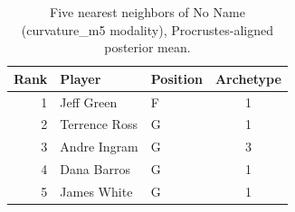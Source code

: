 \begin{table}[htbp]
  \centering\small
  \begin{tabular}{rllc}
    \toprule
    Rank & Player & Position & Archetype \\
    \midrule
    1 & Jeff Green & F & 1 \\
    2 & Terrence Ross & G & 1 \\
    3 & Andre Ingram & G & 3 \\
    4 & Dana Barros & G & 1 \\
    5 & James White & G & 1 \\
    \bottomrule
  \end{tabular}
  \caption{Five nearest neighbors of No Name (curvature_m5 modality), Procrustes-aligned posterior mean.}
  \label{tab:No_Name_neighbors_curvature_m5}
\end{table}

